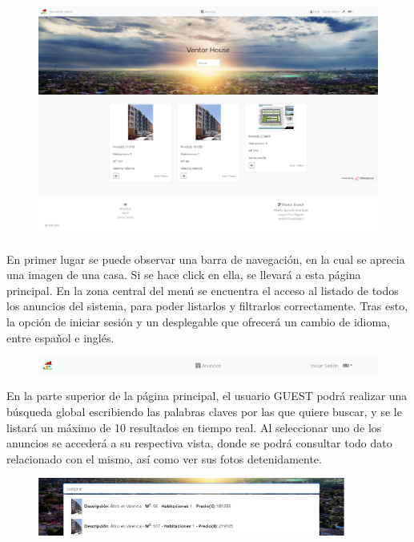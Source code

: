 \begin{figure}[h!]
\centering
\includegraphics[width=.7\textwidth]{Img/ManualUsuario/PPAL_GUEST.jpg}
\end{figure}

En primer lugar se puede observar una barra de navegaci\'{o}n, en la cual se aprecia una imagen de una casa. Si se hace click en ella, se llevar\'{a} a esta p\'{a}gina principal. En la zona central del men\'{u} se encuentra el acceso al listado de todos los anuncios del sistema, para poder listarlos y filtrarlos correctamente. Tras esto, la opci\'{o}n de iniciar sesi\'{o}n y un desplegable que ofrecer\'{a} un cambio de idioma, entre espa\~{n}ol e ingl\'{e}s.

\begin{figure}[h!]
\centering
\includegraphics[width=1\textwidth]{Img/ManualUsuario/NAV_GUEST.png}
\end{figure}


En la parte superior de la p\'{a}gina principal, el usuario GUEST podr\'{a} realizar una b\'{u}squeda global escribiendo las palabras claves por las que quiere buscar, y se le listar\'{a} un m\'{a}ximo de 10 resultados en tiempo real. Al seleccionar uno de los anuncios se acceder\'{a} a su respectiva vista, donde se podr\'{a} consultar todo dato relacionado con el mismo, as\'{i} como ver sus fotos detenidamente.

\begin{figure}[h!]
\centering
\includegraphics[width=0.9\textwidth]{Img/ManualUsuario/GLOBAL_SEARCH_GUEST.jpg}
\end{figure}


